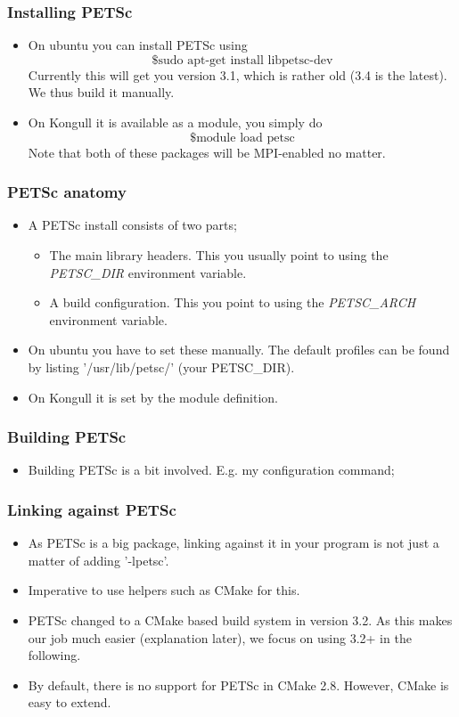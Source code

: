 \documentclass{beamer}
\begin{document}
\begin{frame}\frametitle{Installing PETSc}
  \begin{itemize}
    \item On ubuntu you can install PETSc using
        \[
           \text{\$ sudo apt-get install libpetsc-dev}
        \]
      Currently this will get you version 3.1, which is rather old (3.4 is the latest).
      We thus build it manually.
    \item On Kongull it is available as a module, you simply do
        \[
          \text{\$ module load petsc}
        \]
        Note that both of these packages will be MPI-enabled no matter.
  \end{itemize}
\end{frame}

\begin{frame}\frametitle{PETSc anatomy}
  \begin{itemize}
    \item A PETSc install consists of two parts;
        \begin{itemize}
          \item The main library headers. This you usually point to using
                the \emph{PETSC\_DIR} environment variable.
          \item A build configuration. This you point to using the
                \emph{PETSC\_ARCH} environment variable.
        \end{itemize}
     \item On ubuntu you have to set these manually. The default profiles can
        be found by listing '/usr/lib/petsc/' (your PETSC\_DIR).
     \item On Kongull it is set by the module definition.
  \end{itemize}
\end{frame}

\begin{frame}\frametitle{Building PETSc}
  \begin{itemize}
    \item Building PETSc is a bit involved. E.g. my configuration command;
    
  \end{itemize}
\end{frame}

\begin{frame}\frametitle{Linking against PETSc}
  \begin{itemize}
    \item As PETSc is a big package, linking against it in your program is
        not just a matter of adding '-lpetsc'.
    \item Imperative to use helpers such as CMake for this.
    \item PETSc changed to a CMake based build system in version 3.2. As
        this makes our job much easier (explanation later), we focus on using
        3.2+ in the following.
    \item By default, there is no support for PETSc in CMake 2.8. However,
        CMake is easy to extend.
  \end{itemize}
\end{frame}
\end{document}
